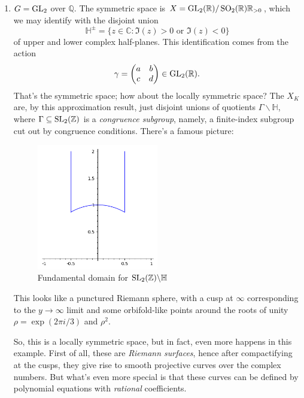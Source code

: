 \documentclass[reqno]{amsart} 
\begin{document}
\begin{enumerate}
\item\label{enumerate:cnpo4gcep4} $G = \operatorname{GL}_2$ over $\mathbb{Q}$.  The symmetric space is $X = \operatorname{GL}_2(\mathbb{R}) / \operatorname{SO}_2(\mathbb{R}) \mathbb{R}_{> 0}$, which we may identify with the disjoint union
  \begin{equation*}
    \mathbb{H}^{\pm} = \{ z \in \mathbb{C} : \Im(z) > 0 \text{ or } \Im(z) < 0\}
  \end{equation*}
  of upper and lower complex half-planes.  This identification comes from the action
  \begin{equation*}
    \gamma =
    \begin{pmatrix}
      a      & b \\
      c & d \\
    \end{pmatrix}
    \in \operatorname{GL}_2(\mathbb{R}).
  \end{equation*}
  That's the symmetric space; how about the locally symmetric space?  The $X_K$ are, by this approximation result, just disjoint unions of quotients $\Gamma \backslash \mathbb{H}$, where $\Gamma \subseteq \operatorname{SL}_2(\mathbb{Z})$ is a \emph{congruence subgroup}, namely, a finite-index subgroup cut out by congruence conditions.  There's a famous picture:
  \begin{figure}[h]
    \centering
    \includegraphics[width=0.5\textwidth]{fund-domain.png}
    \caption{Fundamental domain for $\operatorname{SL}_2(\mathbb{Z}) \backslash \mathbb{H}$}
    \label{fig:myimage}
  \end{figure}
  This looks like a punctured Riemann sphere, with a cusp at $\infty$ corresponding to the $y \rightarrow \infty$ limit and some orbifold-like points around the roots of unity $\rho = \exp(2 \pi i / 3)$ and $\rho^2$.

  So, this is a locally symmetric space, but in fact, even more happens in this example.  First of all, these are \emph{Riemann surfaces}, hence after compactifying at the cusps, they give rise to smooth projective curves over the complex numbers.  But what's even more special is that these curves can be defined by polynomial equations with \emph{rational} coefficients.


\end{enumerate}
\end{document}
